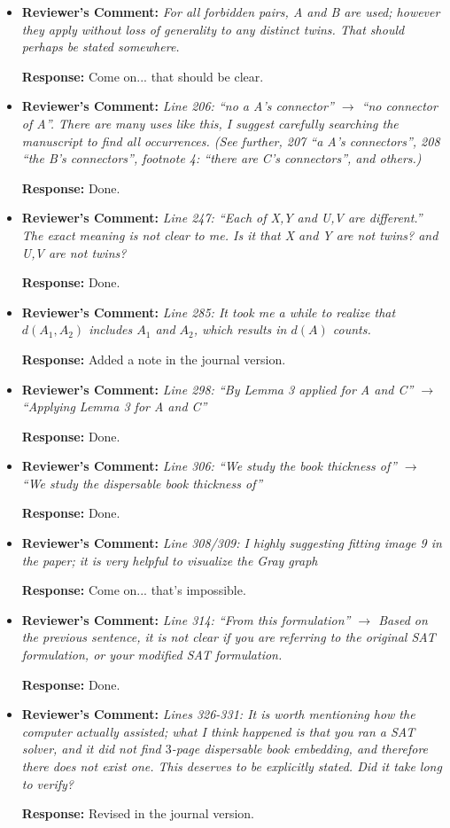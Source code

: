 \documentclass{article}
\newcommand{\rcomment}[1]{\vspace{0.3cm} \item \textbf{Reviewer's Comment:} {\em #1}}
\newcommand{\response}{\vspace{0.2cm} \textbf{Response: }}
\begin{document}
\begin{itemize}
{\begin{itemize}
\response{Done.}

\rcomment{For all forbidden pairs, A and B are used; however they apply without loss of generality to any distinct twins. That should perhaps be stated somewhere.}

\response{Come on... that should be clear.}

\rcomment{Line 206: ``no a A’s connector'' $\rightarrow$ ``no connector of A''. There are many uses like this, I suggest carefully searching the manuscript to find all occurrences. (See further, 207 ``a A’s connectors'', 208 ``the B’s connectors'', footnote 4: ``there are C’s connectors'', and others.)}

\response{Done.}

\rcomment{Line 247: ``Each of X,Y and U,V are different.'' The exact meaning is not clear to me. Is it that X and Y are not twins? and U,V are not twins?}

\response{Done.}

\rcomment{Line 285: It took me a while to realize that $d(A_1,A_2)$ includes $A_1$ and $A_2$, which results in $d(A)$ counts.}

\response{Added a note in the journal version.}

\rcomment{Line 298: ``By Lemma 3 applied for A and C'' $\rightarrow$ ``Applying Lemma 3 for A and C''}

\response{Done.}

\rcomment{Line 306: ``We study the book thickness of'' $\rightarrow$ ``We study the dispersable book thickness of''}

\response{Done.}

\rcomment{Line 308/309: I highly suggesting fitting image 9 in the paper; it is very helpful to visualize the Gray graph}

\response{Come on... that's impossible.}

\rcomment{Line 314: ``From this formulation'' $\rightarrow$ Based on the previous sentence, it is not clear if you are referring to the original SAT formulation, or your modified SAT formulation.}

\response{Done.}

\rcomment{Lines 326-331: It is worth mentioning how the computer actually assisted; what I think happened is that you ran a SAT solver, and it did not find $3$-page dispersable book embedding, and therefore there does not exist one. This deserves to be explicitly stated. Did it take long to verify?}

\response{Revised in the journal version.}


\end{itemize}}
\end{itemize}
\end{document}
